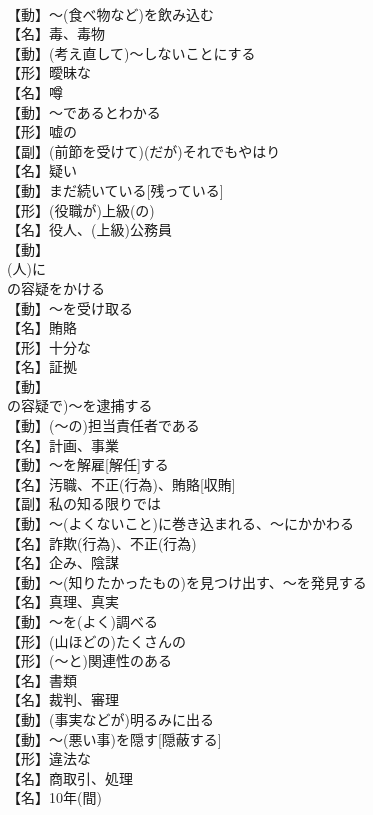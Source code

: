 \documentclass[8pt]{extreport}
\begin{document}
\begin{CJK}{UTF8}{min}
\\	【動】～(食べ物など)を飲み込む
\\	【名】毒、毒物
\\	【動】(考え直して)～しないことにする
\\	【形】曖昧な
\\	【名】噂
\\	【動】～であるとわかる
\\	【形】嘘の
\\	【副】(前節を受けて)(だが)それでもやはり
\\	【名】疑い
\\	【動】まだ続いている[残っている]
\\	【形】(役職が)上級(の)
\\	【名】役人、(上級)公務員
\\	【動】
\\	(人)に
\\	の容疑をかける
\\	【動】～を受け取る
\\	【名】賄賂
\\	【形】十分な
\\	【名】証拠
\\	【動】
\\	の容疑で)～を逮捕する
\\	【動】(～の)担当責任者である
\\	【名】計画、事業
\\	【動】～を解雇[解任]する
\\	【名】汚職、不正(行為)、賄賂[収賄]
\\	【副】私の知る限りでは
\\	【動】～(よくないこと)に巻き込まれる、～にかかわる
\\	【名】詐欺(行為)、不正(行為)
\\	【名】企み、陰謀
\\	【動】～(知りたかったもの)を見つけ出す、～を発見する
\\	【名】真理、真実
\\	【動】～を(よく)調べる
\\	【形】(山ほどの)たくさんの
\\	【形】(～と)関連性のある
\\	【名】書類
\\	【名】裁判、審理
\\	【動】(事実などが)明るみに出る
\\	【動】～(悪い事)を隠す[隠蔽する]
\\	【形】違法な
\\	【名】商取引、処理
\\	【名】10年(間)

\end{CJK}
\end{document}
